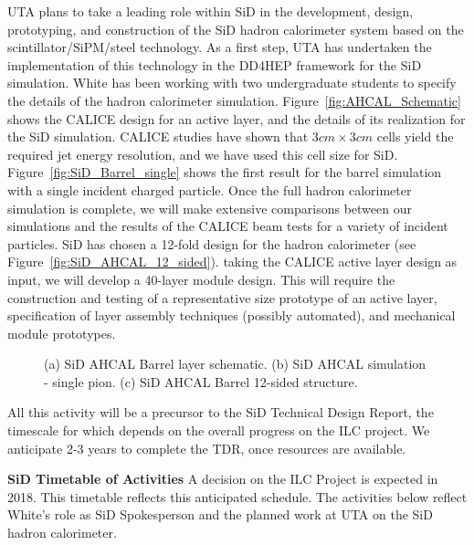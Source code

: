 UTA plans to take a leading role within SiD in the development, design, prototyping, and construction of the SiD hadron calorimeter system 
based on the scintillator/SiPM/steel technology. As a first step, UTA has undertaken the implementation of this technology in the DD4HEP \cite{DD4HEP} 
framework for the SiD simulation. White has been working with two undergraduate students to specify the details of the hadron calorimeter 
simulation. Figure~\ref{fig:AHCAL_Schematic} shows the CALICE design for an active layer, and the details of its realization for the SiD simulation.
CALICE studies have shown that $3cm \times 3cm$ cells yield the required jet energy resolution, and we have used this cell size for SiD.
Figure~\ref{fig:SiD_Barrel_single} shows the first result for the barrel simulation with a single incident charged particle. Once the full hadron calorimeter 
simulation is complete, we will make extensive comparisons between our simulations and the results of the CALICE beam tests for a variety of incident
particles. 
SiD has chosen a 12-fold design for the hadron calorimeter (see Figure~\ref{fig:SiD_AHCAL_12_sided}). taking the CALICE active layer design as input, we will 
develop a 40-layer module design. This will require the construction and testing of a representative size prototype of an active layer,
specification of layer assembly techniques (possibly automated), and mechanical module prototypes.

\begin{figure}[htb]
\centering
%
%
\quad
{}
%
%
\quad
{}

\caption{(a) SiD AHCAL Barrel layer schematic. (b) SiD AHCAL simulation - single pion. 
(c) SiD AHCAL Barrel 12-sided structure.}
\end{figure}

All this activity will be a precursor to the SiD Technical Design Report, the timescale for which depends on the overall progress on the
ILC project. We anticipate 2-3 years to complete the TDR, once resources are available.

\textbf{SiD Timetable of Activities}
A decision on the ILC Project is expected in 2018. This timetable reflects this anticipated schedule.
The activities below reflect White's role as SiD Spokesperson and the planned work at UTA on the SiD hadron calorimeter.

